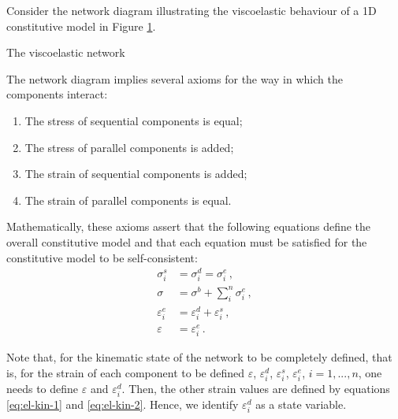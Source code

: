 \documentclass[12pt]{article}
\begin{document}
Consider the network diagram illustrating the viscoelastic behaviour of a 1D constitutive model in Figure \ref{fig:network-diagram}.
\begin{figure}[!htb]
	\centering
	\caption{ }
	\label{fig:network-diagram}
\end{figure}
The viscoelastic network 

The network diagram implies several axioms for the way in which the components interact:
\begin{enumerate}
	\item The stress of sequential components is equal;
	\item The stress of parallel components is added;
	\item The strain of sequential components is added;
	\item The strain of parallel components is equal.
\end{enumerate} 

Mathematically, these axioms assert that the following equations define the overall constitutive model and that each equation must be satisfied for the constitutive model to be self-consistent:
\begin{align}
	\sigma^{s}_{i} &= \sigma^{d}_{i} = \sigma^{e}_{i}\,,\\
	\sigma & = \sigma^{b} + \sum_{i}^{n}\sigma^{e}_{i}\,,\\
	\varepsilon^{e}_{i} &= \varepsilon^{d}_{i} + \varepsilon^{s}_{i}\,,\label{eq:el-kin-1}\\
	\varepsilon& = \varepsilon^{e}_{i}\,.\label{eq:el-kin-2}
\end{align}

Note that, for the kinematic state of the network to be completely defined, that is, for the strain of each component to be defined $\varepsilon$, $\varepsilon^{d}_{i}$, $\varepsilon^{s}_{i}$, $\varepsilon^{e}_{i}$, $i=1,...,n$, one needs to define $\varepsilon$ and $\varepsilon^{d}_{i}$. Then, the other strain values are defined by equations \eqref{eq:el-kin-1} and \eqref{eq:el-kin-2}. Hence, we identify $\varepsilon^{d}_{i}$ as a state variable. 
\end{document}
